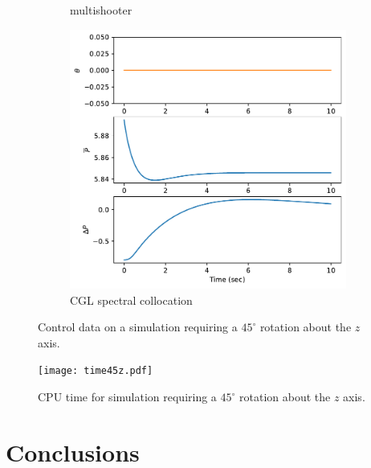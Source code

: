 \documentclass[]{article}
\begin{document}
\begin{figure}[H]
\begin{subfigure}[b]{0.3\textwidth}
		\caption{multishooter}
	\end{subfigure}
	\begin{subfigure}[b]{0.3\textwidth}
		\centering
		\includegraphics[width=\textwidth]{control45dz6.pdf}
		\caption{CGL spectral collocation}
	\end{subfigure}
	\caption{Control data on a simulation requiring a $45^{\circ}$ rotation about the $z$ axis.}
	\label{fig:control45z}
\end{figure}


\begin{figure}[H]
	\centering
	\texttt{[image: time45z.pdf]}
	\caption{CPU time for simulation requiring a $45^{\circ}$ rotation about the $z$ axis.}
	\label{fig:kfangle}
\end{figure}

	\section*{Conclusions}
	
	
	
%	


\end{document}
